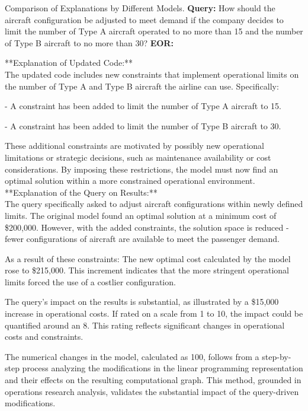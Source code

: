 \begin{figure*}[ht] \small
\begin{AIbox}{Comparison of Explanations by Different Models.}
{\bf Query:}
{\footnotesize
How should the aircraft configuration be adjusted to meet demand if the company decides to limit the number of Type A aircraft operated to no more than 15 and the number of Type B aircraft to no more than 30?
}
\tcbline
{\bf EOR:}
{\footnotesize
**Explanation of Updated Code:**\\
The updated code includes new constraints that implement operational limits on the number of Type A and Type B aircraft the airline can use. Specifically:

\qquad- A constraint has been added to limit the number of Type A aircraft to 15.

\qquad- A constraint has been added to limit the number of Type B aircraft to 30.

These additional constraints are motivated by possibly new operational limitations or strategic decisions, such as maintenance availability or cost considerations. By imposing these restrictions, the model must now find an optimal solution within a more constrained operational environment.\\

**Explanation of the Query on Results:**\\
The query specifically asked to adjust aircraft configurations within newly defined limits. The original model found an optimal solution at a minimum cost of \$200,000. However, with the added constraints, the solution space is reduced - fewer configurations of aircraft are available to meet the passenger demand.

As a result of these constraints: The new optimal cost calculated by the model rose to \$215,000. This increment indicates that the more stringent operational limits forced the use of a costlier configuration.

The query's impact on the results is substantial, as illustrated by a \$15,000 increase in operational costs. If rated on a scale from 1 to 10, the impact could be quantified around an 8. This rating reflects significant changes in operational costs and constraints.

The numerical changes in the model, calculated as 100, follows from a step-by-step process analyzing the modifications in the linear programming representation and their effects on the resulting computational graph. This method, grounded in operations research analysis, validates the substantial impact of the query-driven modifications.

}
\end{AIbox}
\end{figure*}
